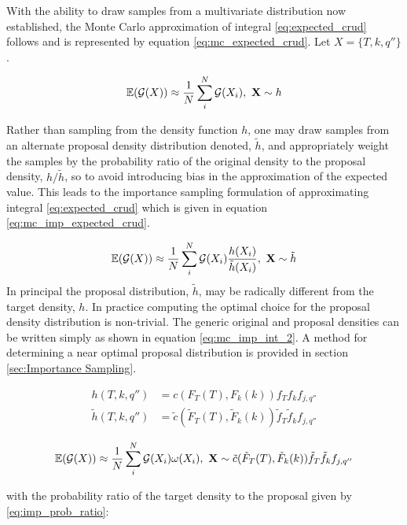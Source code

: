 With the ability to draw samples from a multivariate distribution now established, the Monte Carlo approximation of integral \ref{eq:expected_crud} follows and is represented by equation \ref{eq:mc_expected_crud}.  Let $X=\{T,k,q''\}$.

\begin{equation}
\operatorname*{\mathbb{E}}(\mathcal G(X)) \approx \frac{1}{N} \sum_i^N \mathcal G(X_i), \ \mathbf{X} \sim {h}
\label{eq:mc_expected_crud}
\end{equation}

Rather than sampling from the density function $h$, one may draw samples from an alternate proposal density distribution denoted, $\tilde h$, and appropriately weight the samples by the probability ratio of the original density to the proposal density, $h/\tilde h$, so to avoid introducing bias in the approximation of the expected value.  This leads to the importance sampling formulation of approximating integral \ref{eq:expected_crud}  which is given in equation \ref{eq:mc_imp_expected_crud}.

\begin{equation}
\operatorname*{\mathbb{E}}(\mathcal G(X)) \approx \frac{1}{N} \sum_i^N \mathcal G(X_i) \frac{h(X_i)}{\tilde h(X_i)}, \ \mathbf{X} \sim \tilde{h}
\label{eq:mc_imp_expected_crud}
\end{equation}
In principal the proposal distribution, $\tilde h$, may be radically different from the target density, $h$. In practice computing the optimal choice for the proposal density distribution is non-trivial.   The generic original and proposal densities can be written simply as shown in equation \ref{eq:mc_imp_int_2}. A method for determining a near optimal proposal distribution is provided in section \ref{sec:Importance Sampling}.

\begin{align}
    h(T, k, q'') &= c(F_T(T), F_k(k)) f_T f_k f_{j,q''}  \nonumber \\
    \tilde h(T, k, q'') &= \tilde c(\tilde F_T(T), \tilde F_k(k)) \tilde f_T \tilde f_k f_{j,q''}
\label{eq:mc_imp_int_2}
\end{align}

\begin{equation}
\operatorname*{\mathbb{E}}(\mathcal G(X)) \approx \frac{1}{N} \sum_i^N \mathcal G(X_i) \omega(X_i), \ \mathbf X \sim \tilde c(\tilde F_T(T), \tilde F_k(k)) \tilde f_T \tilde f_k f_{j,q''}
\label{eq:mc_imp_int2}
\end{equation}

with the probability ratio of the target density to the proposal given by \ref{eq:imp_prob_ratio}:

